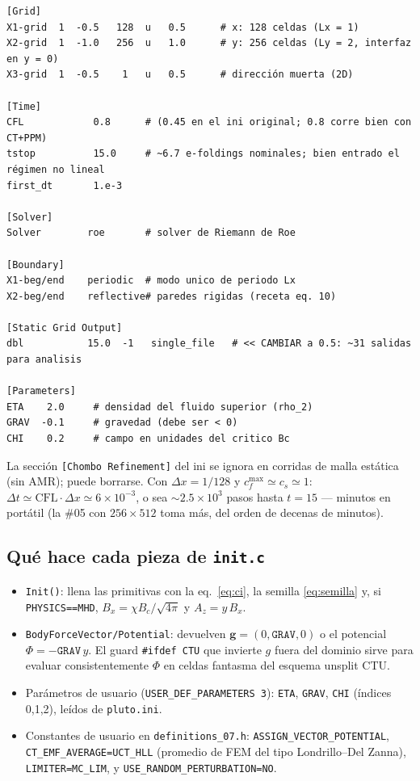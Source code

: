 \documentclass[11pt,a4paper]{article}
\newcommand{\code}[1]{\texttt{#1}}
\begin{document}
{\footnotesize
\begin{verbatim}
[Grid]
X1-grid  1  -0.5   128  u   0.5      # x: 128 celdas (Lx = 1)
X2-grid  1  -1.0   256  u   1.0      # y: 256 celdas (Ly = 2, interfaz en y = 0)
X3-grid  1  -0.5    1   u   0.5      # dirección muerta (2D)

[Time]
CFL            0.8      # (0.45 en el ini original; 0.8 corre bien con CT+PPM)
tstop          15.0     # ~6.7 e-foldings nominales; bien entrado el régimen no lineal
first_dt       1.e-3

[Solver]
Solver        roe       # solver de Riemann de Roe

[Boundary]
X1-beg/end    periodic  # modo unico de periodo Lx
X2-beg/end    reflective# paredes rigidas (receta eq. 10)

[Static Grid Output]
dbl           15.0  -1   single_file   # << CAMBIAR a 0.5: ~31 salidas para analisis

[Parameters]
ETA    2.0     # densidad del fluido superior (rho_2)
GRAV  -0.1     # gravedad (debe ser < 0)
CHI    0.2     # campo en unidades del critico Bc
\end{verbatim}
}

La sección \code{[Chombo Refinement]} del ini se ignora en corridas de malla estática
(sin AMR); puede borrarse. Con $\Delta x=1/128$ y $c_f^{\max}\simeq c_s\simeq 1$:
$\Delta t\simeq \mathrm{CFL}\cdot\Delta x \simeq 6\times10^{-3}$, o sea
$\sim 2.5\times10^3$ pasos hasta $t=15$ — minutos en portátil (la \#05 con $256\times512$
toma más, del orden de decenas de minutos).

\subsection{Qué hace cada pieza de \texttt{init.c}}

\begin{itemize}[nosep]
  \item \code{Init()}: llena las primitivas con la eq.~\eqref{eq:ci}, la semilla
  \eqref{eq:semilla} y, si \code{PHYSICS==MHD}, $B_x=\chi B_c/\sqrt{4\pi}$ y
  $A_z=y\,B_x$.
  \item \code{BodyForceVector/Potential}: devuelven $\mathbf{g}=(0,\code{GRAV},0)$ o el
  potencial $\Phi=-\code{GRAV}\,y$. El guard \code{\#ifdef CTU} que invierte $g$ fuera del
  dominio sirve para evaluar consistentemente $\Phi$ en celdas fantasma del esquema
  unsplit CTU.
  \item Parámetros de usuario (\code{USER\_DEF\_PARAMETERS 3}): \code{ETA}, \code{GRAV},
  \code{CHI} (índices 0,1,2), leídos de \code{pluto.ini}.
  \item Constantes de usuario en \code{definitions\_07.h}: \code{ASSIGN\_VECTOR\_POTENTIAL},
  \code{CT\_EMF\_AVERAGE=\allowbreak UCT\_HLL} (promedio de FEM del tipo
  Londrillo--Del Zanna), \code{LIMITER=MC\_LIM}, y
  \code{USE\_RANDOM\_\allowbreak PERTURBATION=\allowbreak NO}.
\end{itemize}
\end{document}
